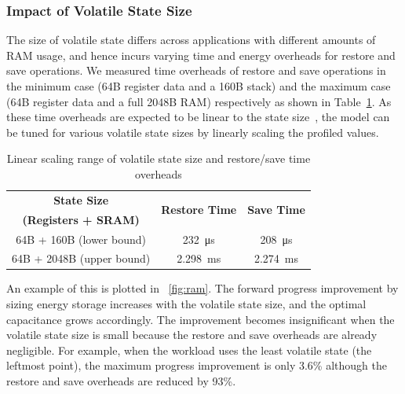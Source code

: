 \subsubsection{Impact of Volatile State Size}

The size of volatile state differs across applications with different amounts of RAM usage, and hence incurs varying time and energy overheads for restore and save operations. We measured time overheads of restore and save operations in the minimum case (64B register data and a 160B stack) and the maximum case (64B register data and a full 2048B RAM) respectively as shown in Table~\ref{tab:ramscale}. As these time overheads are expected to be linear to the state size~\cite{Sliper:2019:ESR:3316781.3317812}, the model can be tuned for various volatile state sizes by linearly scaling the profiled values. 


\begin{table}[!t]
    \renewcommand{\arraystretch}{1.2}
    \centering
    \caption{Linear scaling range of volatile state size and restore/save time overheads}
    \label{tab:ramscale}
    \begin{tabular}{|c|cc|}
    \hline
    \textbf{State Size} & \multirow{2}{*}{\textbf{Restore Time}} & \multirow{2}{*}{\textbf{Save Time}}\\
    \textbf{(Registers + SRAM)} & & \\
    \hline
    64B + 160B (lower bound) & \SI{232}{\micro\second} & \SI{208}{\micro\second}\\
    64B + 2048B (upper bound) & \SI{2.298}{\milli\second} & \SI{2.274}{\milli\second} \\
    \hline
    \end{tabular}
\end{table}

An example of this is plotted in \figurename{~\ref{fig:ram}}. The forward progress improvement by sizing energy storage increases with the volatile state size, and the optimal capacitance grows accordingly. The improvement becomes insignificant when the volatile state size is small because the restore and save overheads are already negligible. For example, when the workload uses the least volatile state (the leftmost point), the maximum progress improvement is only 3.6\% although the restore and save overheads are reduced by 93\%. 

